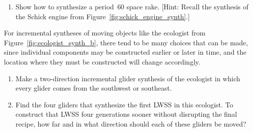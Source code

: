 \begin{multicols}{2}
\begin{problemstar}
\begin{enumerate}[label=\bf\color{ocre}(\alph*)]
			\item Show how to synthesize a period~$60$ space rake. [Hint: Recall the synthesis of the Schick engine from Figure~\ref{fig:schick_engine_synth}.]
		\end{enumerate}
	\end{problemstar}
	
	
	\mfilbreak
	
	
	\begin{problem}\label{exer:ecologist_synth} 
		For incremental syntheses of moving objects like the ecologist from Figure~\ref{fig:ecologist_synth_b}, there tend to be many choices that can be made, since individual components may be constructed earlier or later in time, and the location where they must be constructed will change accordingly.\smallskip
		
		\begin{enumerate}[label=\bf\color{ocre}(\alph*)]
			\item Make a two-direction incremental glider synthesis of the ecologist in which every glider comes from the southwest or southeast.
			
			
			\item Find the four gliders that synthesize the first LWSS in this ecologist. To construct that LWSS four generations sooner without disrupting the final recipe, how far and in what direction should each of these gliders be moved?
			
			
		\end{enumerate}
	\end{problem}
	

\end{multicols}

